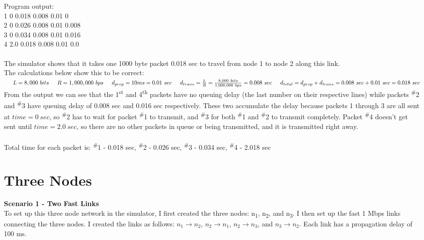 \documentclass[11pt]{article}
\begin{document}
\noindent
Program output: \\
 1 0 0.018 0.008 0.01 0 \\
 2 0 0.026 0.008 0.01 0.008\\
 3 0 0.034 0.008 0.01 0.016\\
 4 2.0 0.018 0.008 0.01 0.0\\
\\
\noindent
The simulator shows that it takes one 1000 byte packet 0.018 sec to travel from node 1 to node 2 along this link.\\
The calculations below show this to be correct:\\
$\indent L = 8,000\ bits \\
\indent R = 1,000,000\ bps \\
\indent d_{prop} = 10ms = 0.01\ sec \\
\indent d_{trans} = \frac{L}{R} = \frac{8,000\ bits}{1,000,000\ bps} = 0.008\ sec \\
\indent d_{total} = d_{prop} + d_{trans} = 0.008\ sec + 0.01\ sec = 0.018\ sec\\$
\\
From the output we can see that the 1\textsuperscript{st} and 4\textsuperscript{th} packets have no queuing delay (the last number on their respective lines) while packets \textsuperscript{\#}2 and \textsuperscript{\#}3 have queuing delay of 0.008 sec and 0.016 sec respectively. These two accumulate the delay because packets 1 through 3 are all sent at $time = 0\ sec$, so \textsuperscript{\#}2 has to wait for packet \textsuperscript{\#}1 to transmit, and \textsuperscript{\#}3 for both \textsuperscript{\#}1 and \textsuperscript{\#}2 to transmit completely. Packet \textsuperscript{\#}4 doesn't get sent until $time = 2.0\ sec$, so there are no other packets in queue or being transmitted, and it is transmitted right away.\\
\\
Total time for each packet is: \textsuperscript{\#}1 - 0.018 sec, \textsuperscript{\#}2 - 0.026 sec, \textsuperscript{\#}3 - 0.034 sec, \textsuperscript{\#}4 - 2.018 sec\\

\section{Three Nodes}

\textbf{Scenario 1 - Two Fast Links}\\
\noindent
To set up this three node network in the simulator, I first created the three nodes: n\textsubscript{1}, n\textsubscript{2}, and n\textsubscript{3}. I then set up the fast 1 Mbps links connecting the three nodes. I created the links as follows: $n_{1}\to{n_{2}}$, $n_{2}\to{n_{1}}$, $n_{2}\to{n_{3}}$, and $n_{3}\to{n_{2}}$. Each link has a propagation delay of 100 ms.\\
\end{document}
